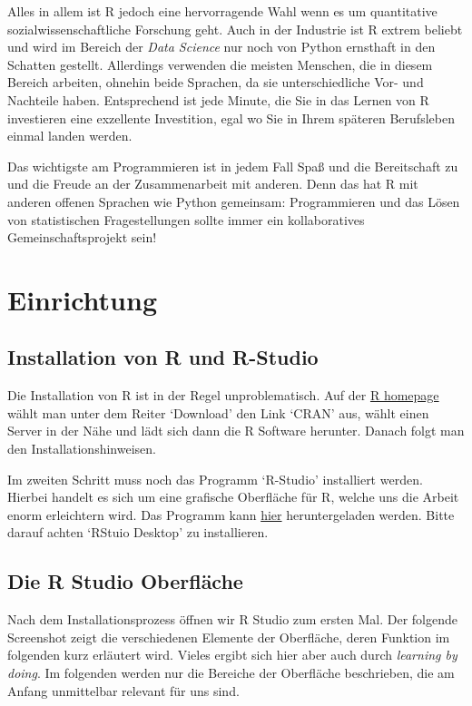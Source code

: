 \documentclass[]{tufte-book}
\begin{document}
Alles in allem ist R jedoch eine hervorragende Wahl wenn es um
quantitative sozialwissenschaftliche Forschung geht. Auch in der
Industrie ist R extrem beliebt und wird im Bereich der \emph{Data
Science} nur noch von Python ernsthaft in den Schatten gestellt.
Allerdings verwenden die meisten Menschen, die in diesem Bereich
arbeiten, ohnehin beide Sprachen, da sie unterschiedliche Vor- und
Nachteile haben. Entsprechend ist jede Minute, die Sie in das Lernen von
R investieren eine exzellente Investition, egal wo Sie in Ihrem späteren
Berufsleben einmal landen werden.

Das wichtigste am Programmieren ist in jedem Fall Spaß und die
Bereitschaft zu und die Freude an der Zusammenarbeit mit anderen. Denn
das hat R mit anderen offenen Sprachen wie Python gemeinsam:
Programmieren und das Lösen von statistischen Fragestellungen sollte
immer ein kollaboratives Gemeinschaftsprojekt sein!

\chapter{Einrichtung}\label{einrichtung}

\section{Installation von R und
R-Studio}\label{installation-von-r-und-r-studio}

Die Installation von R ist in der Regel unproblematisch. Auf der
\href{https://www.r-project.org/}{R homepage} wählt man unter dem Reiter
`Download' den Link `CRAN' aus, wählt einen Server in der Nähe und lädt
sich dann die R Software herunter. Danach folgt man den
Installationshinweisen.

Im zweiten Schritt muss noch das Programm `R-Studio' installiert werden.
Hierbei handelt es sich um eine grafische Oberfläche für R, welche uns
die Arbeit enorm erleichtern wird. Das Programm kann
\href{https://www.rstudio.com/products/rstudio/download/}{hier}
heruntergeladen werden. Bitte darauf achten `RStuio Desktop' zu
installieren.

\section{Die R Studio Oberfläche}\label{die-r-studio-oberflache}

Nach dem Installationsprozess öffnen wir R Studio zum ersten Mal. Der
folgende Screenshot zeigt die verschiedenen Elemente der Oberfläche,
deren Funktion im folgenden kurz erläutert wird. Vieles ergibt sich hier
aber auch durch \emph{learning by doing}. Im folgenden werden nur die
Bereiche der Oberfläche beschrieben, die am Anfang unmittelbar relevant
für uns sind.
\end{document}
